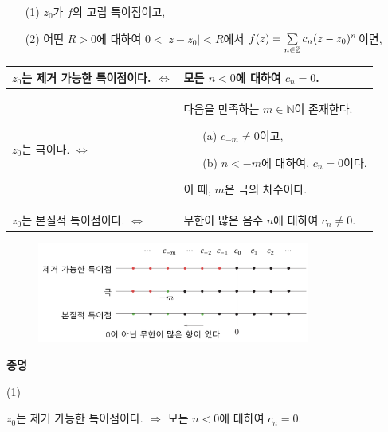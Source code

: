 \begin{salttheorem} {}{} \label{thm-4-9}

\begin{itemize}
\item[(1)] $z_0$가 $f$의 고립 특이점이고,
\item[(2)] 어떤 $R>0$에 대하여 $0<|z-z_0|<R$에서
$f(z)= \sum\limits_{n\in\mathbb Z} c_n(z-z_0)^n$이면,
\end{itemize}
\begin{center}
\begin{tabular}{ |p{5.2cm}|p{6cm}| } 
 \hline
$z_0$는 제거 가능한 특이점이다. \hfill $\Leftrightarrow$ 
& 모든 $n<0$에 대하여 $c_n=0$. \\ \hline 
$z_0$는 극이다. \hfill $\Leftrightarrow$ 
& 다음을 만족하는 $m\in\mathbb N$이 존재한다.
\begin{itemize}
\item[(a)]  $c_{-m} \ne 0$이고,
\item[(b)] $n<-m$에 대하여, $c_n=0$이다.
\end{itemize}
이 때, $m$은 극의 차수이다. \\ \hline
$z_0$는 본질적 특이점이다. \hfill $\Leftrightarrow$ 
& 무한이 많은 음수  $n$에 대하여 $c_n\ne0$. \\ 
 \hline
\end{tabular}
\end{center}
\end{salttheorem}


\begin{figure}[h!]
\begin{center}
\includegraphics[width=0.8\textwidth]{./SaltChapter/figs/fig-4-0-8-kr}
\end{center}
\end{figure}

\newpage %

{\bf 증명}

(1) \
\begin{tcolorbox}[tcbox raise base, nobeforeafter, hbox, colback=white, colframe = mydarkframe, boxrule=1pt]
$z_0$는 제거 가능한 특이점이다. 
$\Rightarrow$ 모든 $n<0$에 대하여 $c_n=0$.
\end{tcolorbox}


